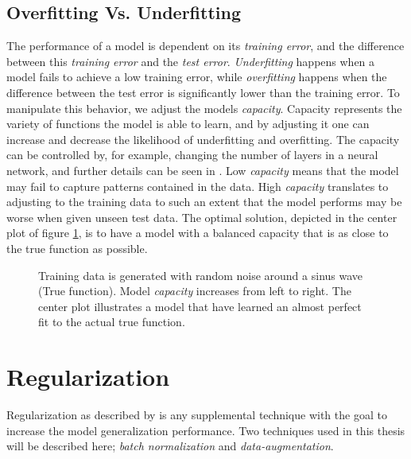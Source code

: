     \subsection{Overfitting Vs. Underfitting}
        The performance of a model is dependent on its \textit{training error}, and the difference between this \textit{training error} and the \textit{test error}. \textit{Underfitting} happens when a model fails to achieve a low training error, while \textit{overfitting} happens when the difference between the test error is significantly lower than the training error. To manipulate this behavior, we adjust the models \textit{capacity}. Capacity represents the variety of functions the model is able to learn, and by adjusting it one can increase and decrease the likelihood of underfitting and overfitting. The capacity can be controlled by, for example, changing the number of layers in a neural network, and further details can be seen in \citeauthor{Goodfellow-et-al-2016}\cite{Goodfellow-et-al-2016}. Low \textit{capacity} means that the model may fail to capture patterns contained in the data. High \textit{capacity} translates to adjusting to the training data to such an extent that the model performs may be worse when given unseen test data. The optimal solution, depicted in the center plot of figure \ref{over/under fit fig}, is to have a model with a balanced capacity that is as close to the true function as possible\cite{Goodfellow-et-al-2016}. 
        
        
        \begin{figure}[H]
            \centering
            
            \caption[Over/under-fit]{Training data is generated with random noise around a sinus wave (True function). Model \textit{capacity} increases from left to right. The center plot illustrates a model that have learned an almost perfect fit to the actual true function.}
          	\medskip 
            \label{over/under fit fig}
        \end{figure}
        
        
\section{Regularization}
    Regularization as described by \citeauthor{kukavcka2017_regularization}\cite{kukavcka2017_regularization} is any supplemental technique with the goal to increase the model generalization performance. Two techniques used in this thesis will be described here; \textit{batch normalization} and \textit{data-augmentation}.
    

